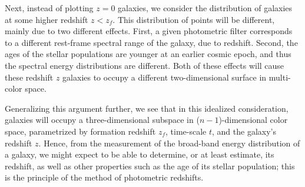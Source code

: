 \documentclass[a4paper,11pt]{article}
\begin{document}
{\noindent}Next, instead of plotting $z=0$ galaxies, we consider the distribution of galaxies at some higher redshift $z<z_f$. This distribution of points will be different, mainly due to two different effects. First, a given photometric filter corresponds to a different rest-frame spectral range of the galaxy, due to redshift. Second, the ages of the stellar populations are younger at an earlier cosmic epoch, and thus the spectral energy distributions are different. Both of these effects will cause these redshift $z$ galaxies to occupy a different two-dimensional surface in multi-color space.

{\noindent}Generalizing this argument further, we see that in this idealized consideration, galaxies will occupy a three-dimensional subspace in ($n-1$)-dimensional color space, parametrized by formation redshift $z_f$, time-scale $t$, and the galaxy’s redshift $z$. Hence, from the measurement of the broad-band energy distribution of a galaxy, we might expect to be able to determine, or at least estimate, its redshift, as well as other properties such as the age of its stellar population; this is the principle of the method of photometric redshifts.
\end{document}
